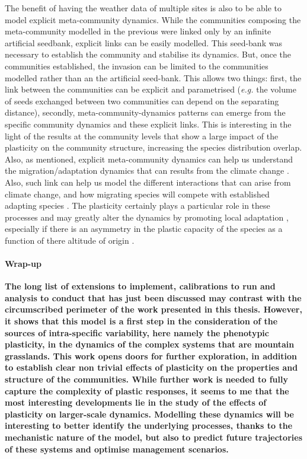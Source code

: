 The benefit of having the weather data of multiple sites is also to be able to model explicit meta-community dynamics. While the communities composing the meta-community modelled in the previous were linked only by an infinite artificial seedbank, explicit links can be easily modelled. This seed-bank was necessary to establish the community and stabilise its dynamics. But, once the communities established, the invasion can be limited to the communities modelled rather than an the artificial seed-bank. This allows two things: first, the link between the communities can be explicit and parametrised (\textit{e.g.} the volume of seeds exchanged between two communities can depend on the separating distance), secondly, meta-community-dynamics patterns can emerge from the specific community dynamics and these explicit links. This is interesting in the light of the results at the community levels that show a large impact of the plasticity on the community structure, increasing the species distribution overlap. Also, as mentioned, explicit meta-community dynamics can help us understand the migration/adaptation dynamics that can results from the climate change \parencite{morin_comparing_2009}. Also, such link can help us model the different interactions that can arise from climate change, and how migrating species will compete with established adapting species \parencite{alexander_novel_2015}. The plasticity certainly plays a particular role in these processes and may greatly alter the dynamics by promoting local adaptation \parencite{frei_plant_2014, frei_plastic_2014}, especially if there is an asymmetry in the plastic capacity of the species as a function of there altitude of origin \parencite{gugger_lower_2015, nicotra_adaptive_2015}.
%
%
%


\paragraph{Wrap-up}

\textbf{The long list of extensions to implement, calibrations to run and analysis to conduct that has just been discussed may contrast with the circumscribed perimeter of the work presented in this thesis. However, it shows that this model is a first step in the consideration of the sources of intra-specific variability, here namely the phenotypic plasticity, in the dynamics of the complex systems that are mountain grasslands. This work opens doors for further exploration, in addition to establish clear non trivial effects of plasticity on the properties and structure of the communities. While further work is needed to fully capture the complexity of plastic responses, it seems to me that the most interesting developments lie in the study of the effects of plasticity on larger-scale dynamics. Modelling these dynamics will be interesting to better identify the underlying processes, thanks to the mechanistic nature of the model, but also to predict future trajectories of these systems and optimise management scenarios.}

